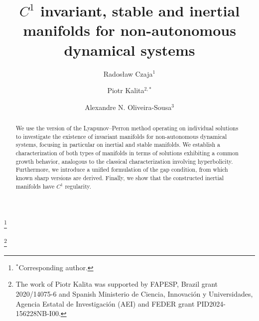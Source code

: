 \documentclass[a4paper,11pt,reqno]{amsart}
\theoremstyle{plain}
\theoremstyle{definition}
\numberwithin{equation}{section}
\newenvironment{nouppercase}{%
	\let\uppercase\relax%
	\renewcommand{\uppercasenonmath}[1]{}}{}
\begin{document}
\title{$C^1$ invariant, stable and inertial manifolds  for non-autonomous dynamical systems}

\author[R. Czaja]{Rados{\l}aw Czaja$^{1}$}

\address{$^1$Institute of Mathematics, University of Silesia in Katowice, Bankowa 14, 40-007 Katowice, Poland.
E-mail address: \textup{radoslaw.czaja@us.edu.pl}}

\author[P. Kalita]{Piotr Kalita$^{2,*}$}

\address{$^2$Faculty of Mathematics and Computer Science, Jagiellonian University, {\L}ojasiewicza 6, 30-348 Krak\'ow,
Poland. E-mail address: \textup{piotr.kalita@uj.edu.pl}}

\thanks{$^*$Corresponding author.}

\thanks{The work of Piotr Kalita was supported by FAPESP, Brazil grant 2020/14075-6 and Spanish Ministerio de Ciencia, Innovación y Universidades, Agencia Estatal de Investigación (AEI) and FEDER grant PID2024-156228NB-I00.}


\author[A. Oliveira-Sousa]{Alexandre N. Oliveira-Sousa$^{3}$}

\address{$^{3}$Departamento de  Ma\-te\-m\'{a}\-ti\-ca\\ Universidade Federal de Santa Catarina \\	Caixa Postal 88040-900, Florian\'opolis SC, Brazil. E-mail address:
\textup{alexandre.n.o.sousa@ufsc.br}}




\begin{abstract}

We use the version of the Lyapunov--Perron method operating on individual solutions to investigate the existence of invariant manifolds for non-autonomous dynamical systems, focusing in particular on inertial and stable manifolds. We establish a characterization of both types of manifolds in terms of solutions exhibiting a common growth behavior, analogous to the classical characterization involving hyperbolicity. Furthermore, we introduce a unified formulation of the gap condition, from which known sharp versions are derived. Finally, we show that the constructed inertial manifolds have $C^1$ regularity. 


\end{abstract}
\begin{nouppercase}
\maketitle
\end{nouppercase}
\end{document}

